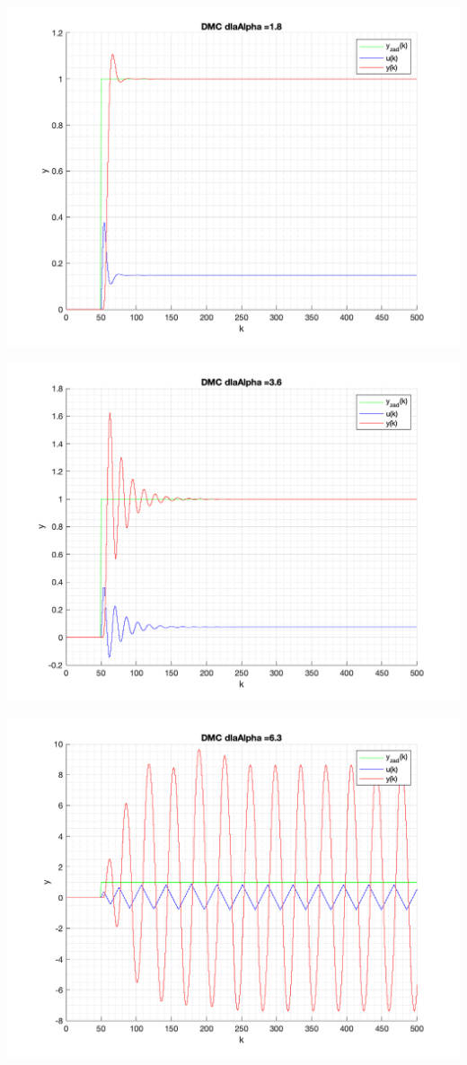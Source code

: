\documentclass[a4paper, 11pt]{article}
\begin{document}
\begin{enumerate}
 \includegraphics[width=\linewidth]{./ModelsDodatkowe_Alpha/P4_DMC_Alpha_1_8_png.png} 
 
 \includegraphics[width=\linewidth]{./ModelsDodatkowe_Alpha/P4_DMC_Alpha_3_6_png.png} 
 
 \includegraphics[width=\linewidth]{./ModelsDodatkowe_Alpha/P4_DMC_Alpha_6_3_png.png} 
 

\end{enumerate}
\end{document}
